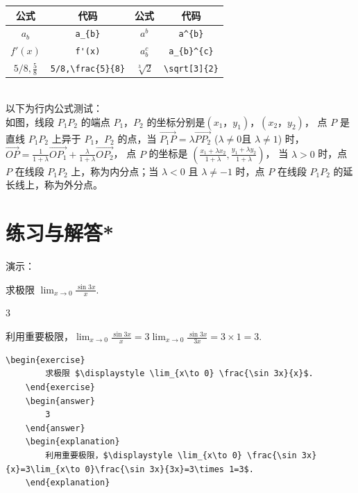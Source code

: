 \documentclass{ctexart}
\begin{document}
\begin{tabular}{|c|c|c|c|}
    \hline
    公式 & 代码 & 公式 & 代码 \\
    \hline
    $a_{b}$ & \verb|a_{b}| & $a^{b}$ & \verb|a^{b}| \\
    \hline
    $f'(x)$ & \verb|f'(x)| & $a_{b}^{c}$ & \verb|a_{b}^{c}| \\
    \hline
    $5/8,\frac{5}{8}$ & \verb|5/8,\frac{5}{8}| & $\sqrt[3]{2}$ & \verb|\sqrt[3]{2}| \\
    \hline   
\end{tabular}\\
以下为行内公式测试：\\
如图，线段 \(P_1 P_2\) 的端点 \(P_1\)，\(P_2\) 的坐标分别是$(x_1，y_1)$，$(x_2，y_2)$，
点 \(P\) 是直线 \(P_1 P_2\) 上异于 \(P_1\)，\(P_2\) 的点，当 \(\overrightarrow{P_1 P }=\lambda\overrightarrow{PP_2}\) 
($\lambda\neq 0$且 \(\lambda\neq 1\)) 时，\(\overrightarrow{OP} =\frac{1}{1 + \lambda} \overrightarrow{OP_1} + \frac{\lambda}{1 + \lambda} \overrightarrow{OP_2}\)，
点 \(P\) 的坐标是 \(\left(\frac{x_1 + \lambda x_2}{1 + \lambda} , \frac{y_1 + \lambda y_2}{1 + \lambda}\right)\)，
当 \(\lambda>0\) 时，点 \(P\) 在线段 \(P_1 P_2\) 上，称为内分点；当 \(\lambda<0\) 且 \(\lambda\neq -1\) 时，点 \(P\) 在线段 \(P_1 P_2\) 的延长线上，称为外分点。





\newpage
\section{练习与解答*}
演示：
\begin{exercise}
    求极限 $\displaystyle \lim_{x\to 0} \frac{\sin 3x}{x}$.
\end{exercise}
\begin{answer}
    3
\end{answer}
\begin{explanation}
    利用重要极限，$\displaystyle \lim_{x\to 0} \frac{\sin 3x}{x}=3\lim_{x\to 0}\frac{\sin 3x}{3x}=3\times 1=3$.
\end{explanation}

\begin{lstlisting}[language={[LaTeX]TeX}]
    \begin{exercise}
        求极限 $\displaystyle \lim_{x\to 0} \frac{\sin 3x}{x}$.
    \end{exercise}
    \begin{answer}
        3
    \end{answer}
    \begin{explanation}
        利用重要极限，$\displaystyle \lim_{x\to 0} \frac{\sin 3x}{x}=3\lim_{x\to 0}\frac{\sin 3x}{3x}=3\times 1=3$.
    \end{explanation}
\end{lstlisting}
\end{document}
